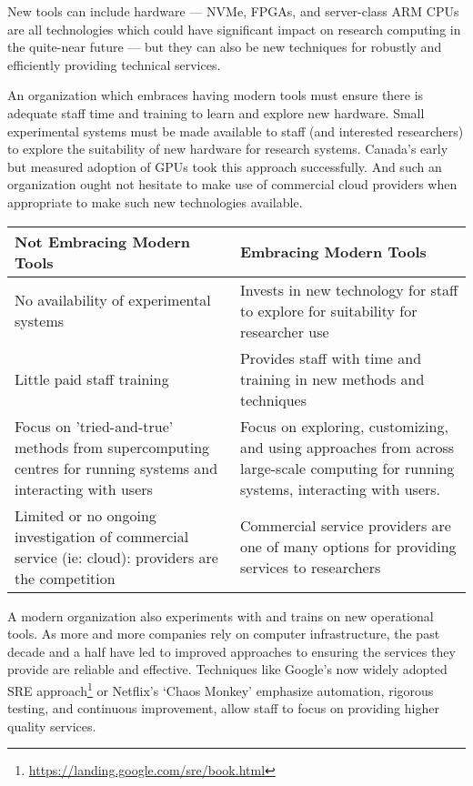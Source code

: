 \documentclass[11pt, letterpaper, twoside]{article}
\begin{document}
New tools can include hardware --- NVMe, FPGAs, and server-class ARM
CPUs are all technologies which could have significant impact on
research computing in the quite-near future --- but they can also be new
techniques for robustly and efficiently providing technical services.


An organization which embraces having modern tools must ensure there is
adequate staff time and training to learn and explore new hardware.
Small experimental systems must be made available to staff (and
interested researchers) to explore the suitability of new hardware for
research systems. Canada's early but measured adoption of GPUs took this
approach successfully. And such an organization ought not hesitate to
make use of commercial cloud providers when appropriate to make such new
technologies available.

\begin{table}[ht] \centering \small {\sffamily
{} \begin{tabular}{P{2.5in}|P{2.5in}}
\textcolor{cdaRed}{\textbf{Not Embracing Modern Tools}} &
\textcolor{cdaRed}{\textbf{Embracing Modern Tools}} \\ \hline \hline No
availability of experimental systems & Invests in new technology
for staff to explore for suitability for researcher use \\ Little
paid staff training & Provides staff with time and training in new
methods and techniques \\ 
Focus on 'tried-and-true' methods from supercomputing centres for
running systems and interacting with users & Focus on exploring,
customizing, and using approaches from across large-scale computing for
running systems, interacting with users. \\
Limited or no ongoing investigation of commercial service (ie: cloud):
providers are the competition & Commercial service providers are one of
many options for providing services to researchers\\
\hline
\end{tabular}
}
\end{table}

A modern organization also experiments with and trains on new
operational tools. As more and more companies rely on computer
infrastructure, the past decade and a half have led to improved
approaches to ensuring the services they provide are reliable and
effective. Techniques like Google's now widely adopted SRE
approach\footnote{\url{https://landing.google.com/sre/book.html}} or
Netflix's `Chaos Monkey' emphasize automation, rigorous testing, and
continuous improvement, allow staff to focus on providing higher quality
services.
\end{document}
